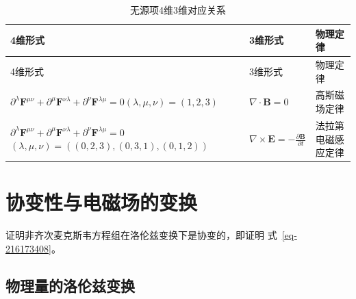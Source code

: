 \documentclass[
  chinese,
  a4paper,
  UTF8,
  12pt,
  oneside,
  openany]{ctexbook}
\begin{document}
\begin{longtable}[]{@{}
  >{\raggedright\arraybackslash}p{}
  >{\raggedright\arraybackslash}p{}
  >{\raggedright\arraybackslash}p{}@{}}
\caption{无源项4维3维对应关系}\label{tbl-tab-sourceless}\tabularnewline
\toprule\noalign{}
\begin{minipage}[b]{\linewidth}\raggedright
4维形式
\end{minipage} & \begin{minipage}[b]{\linewidth}\raggedright
3维形式
\end{minipage} & \begin{minipage}[b]{\linewidth}\raggedright
物理定律
\end{minipage} \\
\midrule\noalign{}
\endfirsthead
\toprule\noalign{}
\begin{minipage}[b]{\linewidth}\raggedright
4维形式
\end{minipage} & \begin{minipage}[b]{\linewidth}\raggedright
3维形式
\end{minipage} & \begin{minipage}[b]{\linewidth}\raggedright
物理定律
\end{minipage} \\
\midrule\noalign{}
\endhead
\bottomrule\noalign{}
\endlastfoot
\(\partial^{\lambda}\mathbf{F}^{\mu\nu} + \partial^{\mu}\mathbf{F}^{\nu\lambda} + \partial^{\nu}\mathbf{F}^{\lambda\mu} = 0\)\((\lambda,\mu,\nu) = (1,2,3)\)
& \(\nabla \cdot \mathbf{B} = 0\) & 高斯磁场定律 \\
\(\partial^{\lambda}\mathbf{F}^{\mu\nu} + \partial^{\mu}\mathbf{F}^{\nu\lambda} + \partial^{\nu}\mathbf{F}^{\lambda\mu} = 0\)\((\lambda,\mu,\nu) = \left( (0,2,3),(0,3,1),(0,1,2) \right)\)
& \(\nabla \times \mathbf{E} = - \frac{\partial\mathbf{B}}{\partial t}\)
& 法拉第电磁感应定律 \\
\end{longtable}

\section{协变性与电磁场的变换}\label{ux534fux53d8ux6027ux4e0eux7535ux78c1ux573aux7684ux53d8ux6362}

证明非齐次麦克斯韦方程组在洛伦兹变换下是协变的，即证明
式~\ref{eq-216173408}。

\subsection{物理量的洛伦兹变换}\label{ux7269ux7406ux91cfux7684ux6d1bux4f26ux5179ux53d8ux6362}
\end{document}

